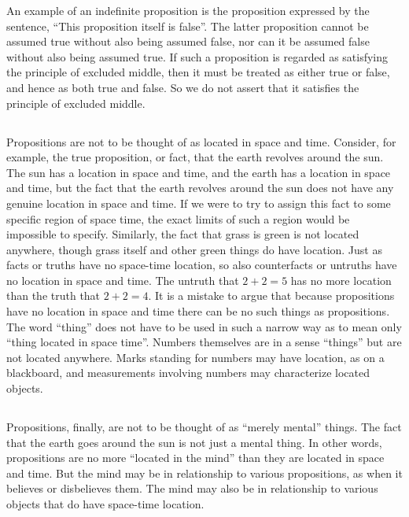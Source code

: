 \documentclass{book}
\let\oldmarginpar\marginpar
\renewcommand*{\marginpar}[1]{\oldmarginpar{\footnotesize#1}}
\begin{document}
An example of an indefinite proposition is the proposition expressed by the sentence, “This proposition itself is false”.  The latter proposition cannot be assumed true without also being assumed false, nor can it be assumed false without also being assumed true.  If such a proposition is regarded as satisfying the principle of excluded middle, then it must be treated as either true or false, and hence as both true and false.  So we do not assert that it satisfies the principle of excluded middle.

\subsection{}
\label{sec:2.15}

Propositions are not to be thought of as located in space and time.  Consider, for example, the true proposition, or fact, that the earth revolves around the sun.  The sun has a location in space and time, and the earth has a location in space and time, but the fact that the earth revolves around the sun does not have any genuine location in space and time.  If we were to try to assign this fact to some specific region of space time, the exact limits of such a region \marginpar{\hfill 9}would be impossible to specify.  Similarly, the fact that grass is green is not located anywhere, though grass itself and other green things do have location.  Just as facts or truths have no space-time location, so also counterfacts or untruths have no location in space and time.  The untruth that \(2 + 2 = 5\) has no more location than the truth that \(2 + 2 = 4\).  It is a mistake to argue that because propositions have no location in space and time there can be no such things as propositions.  The word “thing” does not have to be used in such a narrow way as to mean only “thing located in space time”.  Numbers themselves are in a sense “things” but are not located anywhere.  Marks standing for numbers may have location, as on a blackboard, and measurements involving numbers may characterize located objects.

\subsection{}
\label{sec:2.16}

Propositions, finally, are not to be thought of as “merely mental” things.  The fact that the earth goes around the sun is not just a mental thing.  In other words, propositions are no more “located in the mind” than they are located in space and time.  But the mind may be in relationship to various propositions, as when it believes or disbelieves them.  The mind may also be in relationship to various objects that do have space-time location.
\end{document}
